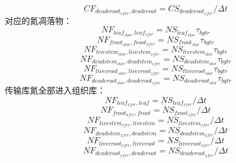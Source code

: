 \begin{equation}
  CF_{deadcroot_{xfer},deadcroot}=CS_{deadcroot_{xfer}}/\Delta t
\end{equation}
对应的氮凋落物：
\begin{equation}
  NF_{leaf_{stor},leaf_{xfer}}=NS_{leaf_{stor}}\tau_{bgtr}
\end{equation}
\begin{equation}
  NF_{froot_{stor},froot_{xfer}}=NS_{froot_{stor}}\tau_{bgtr}
\end{equation}
\begin{equation}
  NF_{livestem_{stor},livestem_{xfer}}=NS_{livestem_{stor}}\tau_{bgtr}
\end{equation}
\begin{equation}
  NF_{deadstem_{stor},deadstem_{xfer}}=NS_{deadstem_{stor}}\tau_{bgtr}
\end{equation}
\begin{equation}
  NF_{livecroot_{stor},livecroot_{xfer}}=NS_{livecroot_{stor}}\tau_{bgtr}
\end{equation}
\begin{equation}
  NF_{deadcroot_{stor},deadcroot_{xfer}}=NS_{deadcroot_{stor}}\tau_{bgtr}
\end{equation}
传输库氮全部进入组织库：
\begin{equation}
  NF_{leaf_{xfer},leaf}=NS_{leaf_{xfer}}/\Delta t
\end{equation}
\begin{equation}
  NF_{froot_{xfer},froot}=NS_{froot_{xfer}}/\Delta t
\end{equation}
\begin{equation}
  NF_{livestem_{xfer},livestem}=NS_{livestem_{xfer}}/\Delta t
\end{equation}
\begin{equation}
  NF_{deadstem_{xfer},deadstem}=NS_{deadstem_{xfer}}/\Delta t
\end{equation}
\begin{equation}
  NF_{livecroot_{xfer},livecroot}=NS_{livecroot_{xfer}}/\Delta t
\end{equation}
\begin{equation}
  NF_{deadcroot_{xfer},deadcroot}=NS_{deadcroot_{xfer}}/\Delta t
\end{equation}



